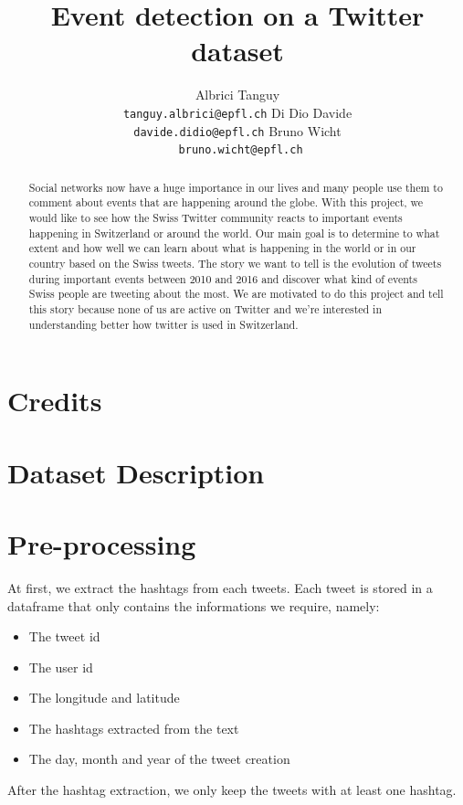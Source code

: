 \documentclass[11pt]{article}
\title{Event detection on a Twitter dataset}
\author{ 
  Albrici Tanguy \hspace{40px} \\
  {\tt tanguy.albrici@epfl.ch} \hspace{40px} \And
  Di Dio Davide \\
  {\tt davide.didio@epfl.ch} \And
   \hspace{40px} Bruno Wicht \\
{\tt \hspace{40px} bruno.wicht@epfl.ch} \\}
\date{}
\begin{document}
\maketitle
\begin{abstract}
  Social networks now have a huge importance in our lives and many people use them to comment about events that are happening around the globe. With this project, we would like to see how the Swiss Twitter community reacts to important events happening in Switzerland or around the world. Our main goal is to determine to what extent and how well we can learn about what is happening in the world or in our country based on the Swiss tweets. The story we want to tell is the evolution of tweets during important events between 2010 and 2016 and discover what kind of events Swiss people are tweeting about the most. We are motivated to do this project and tell this story because none of us are active on Twitter and we're interested in understanding better how twitter is used in Switzerland.
\end{abstract}

\section{Credits}


\section{Dataset Description}


\section{Pre-processing}

At first, we extract the hashtags from each tweets. Each tweet is stored in a dataframe that only contains the informations we require, namely: 
\begin{itemize}

\item The tweet id 
\item The user id
\item The longitude and latitude
\item The hashtags extracted from the text
\item The day, month and year of the tweet creation

\end{itemize}

After the hashtag extraction, we only keep the tweets with at least one hashtag.
\end{document}
